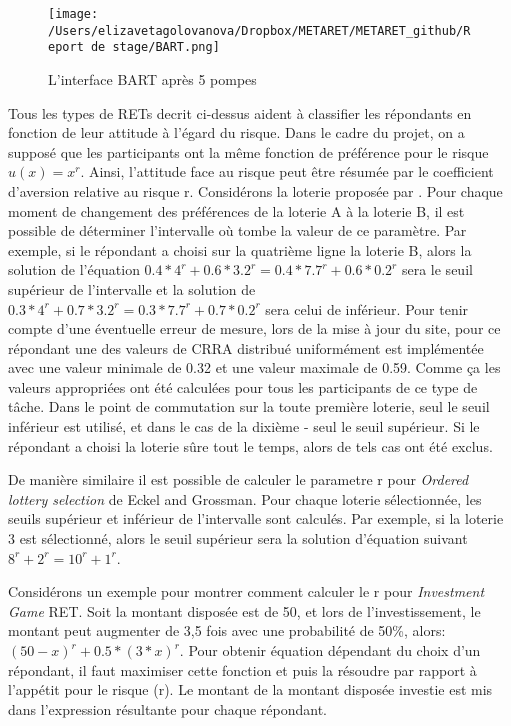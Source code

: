 \documentclass[12pt]{article}
\begin{document}
\begin{figure}
\centering
\texttt{[image: /Users/elizavetagolovanova/Dropbox/METARET/METARET\_github/Report de stage/BART.png]}
\caption{L'interface BART après 5 pompes}
\end{figure}

Tous les types de RETs decrit ci-dessus aident à classifier les
répondants en fonction de leur attitude à l'égard du risque. Dans le
cadre du projet, on a supposé que les participants ont la même fonction
de préférence pour le risque \(u(x) = x^r\). Ainsi, l'attitude face au
risque peut être résumée par le coefficient d'aversion relative au
risque r. Considérons la loterie proposée par \citet{Holt2002}. Pour
chaque moment de changement des préférences de la loterie A à la loterie
B, il est possible de déterminer l'intervalle où tombe la valeur de ce
paramètre. Par exemple, si le répondant a choisi sur la quatrième ligne
la loterie B, alors la solution de l'équation
\(0.4*4^r + 0.6*3.2^r = 0.4*7.7^r + 0.6*0.2^r\) sera le seuil supérieur
de l'intervalle et la solution de
\(0.3*4^r + 0.7*3.2^r = 0.3*7.7^r + 0.7*0.2^r\) sera celui de inférieur.
Pour tenir compte d'une éventuelle erreur de mesure, lors de la mise à
jour du site, pour ce répondant une des valeurs de CRRA distribué
uniformément est implémentée avec une valeur minimale de 0.32 et une
valeur maximale de 0.59. Comme ça les valeurs appropriées ont été
calculées pour tous les participants de ce type de tâche. Dans le point
de commutation sur la toute première loterie, seul le seuil inférieur
est utilisé, et dans le cas de la dixième - seul le seuil supérieur. Si
le répondant a choisi la loterie sûre tout le temps, alors de tels cas
ont été exclus.

De manière similaire il est possible de calculer le parametre r pour
\emph{Ordered lottery selection} de Eckel and Grossman. Pour chaque
loterie sélectionnée, les seuils supérieur et inférieur de l'intervalle
sont calculés. Par exemple, si la loterie 3 est sélectionné, alors le
seuil supérieur sera la solution d'équation suivant
\(8^r + 2^r = 10^r + 1^r\).

Considérons un exemple pour montrer comment calculer le r pour
\emph{Investment Game} RET. Soit la montant disposée est de 50, et lors
de l'investissement, le montant peut augmenter de 3,5 fois avec une
probabilité de 50\%, alors: \((50 - x)^r + 0.5 * (3 * x)^r\). Pour
obtenir équation dépendant du choix d'un répondant, il faut maximiser
cette fonction et puis la résoudre par rapport à l'appétit pour le
risque (r). Le montant de la montant disposée investie est mis dans
l'expression résultante pour chaque répondant.
\end{document}
